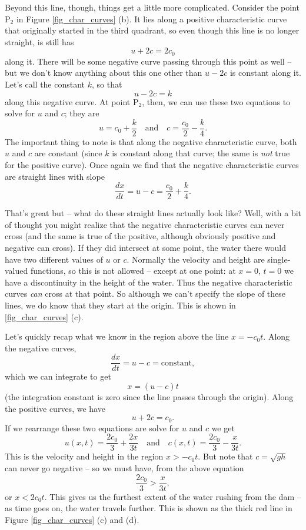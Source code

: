 Beyond this line, though, things get a little more complicated.  Consider the point P$_2$ in Figure \ref{fig_char_curves} (b).  It lies along a positive characteristic curve that originally started in the third quadrant, so even though this line is no longer straight, is still has
\[
u + 2c = 2c_0
\]
along it.  There will be some negative curve passing through this point as well -- but we don't know anything about this one other than $u-2c$ is constant along it.  Let's call the constant $k$, so that
\[
u - 2c = k
\]
along this negative curve.  At point P$_2$, then, we can use these two equations to solve for $u$ and $c$; they are
\[
u = c_0 + \frac{k}{2} \quad \text{and} \quad c = \frac{c_0}{2} - \frac{k}{4}.
\]
The important thing to note is that along the negative characteristic curve, both $u$ and $c$ are constant (since $k$ is constant along that curve; the same is \emph{not} true for the positive curve).  Once again we find that the negative characteristic curves are straight lines with slope
\[
\frac{dx}{dt} = u - c = \frac{c_0}{2} + \frac{k}{4}.
\]

That's great but -- what do these straight lines actually look like?  Well, with a bit of thought you might realize that the negative characteristic curves can never cross (and the same is true of the positive, although obviously positive and negative can cross).  If they did intersect at some point, the water there would have two different values of $u$ or $c$.  Normally the velocity and height are single-valued functions, so this is not allowed -- except at one point: at $x = 0$, $t=0$ we have a discontinuity in the height of the water.  Thus the negative characteristic curves \emph{can} cross at that point.  So although we can't specify the slope of these lines, we do know that they start at the origin.  This is shown in \ref{fig_char_curves} (c). 

Let's quickly recap what we know in the region above the line $x = -c_0 t$.  Along the negative curves, 
\[
\frac{dx}{dt} = u - c = \text{constant},
\]
which we can integrate to get
\[
x = (u-c) t
\]
(the integration constant is zero since the line passes through the origin).
Along the positive curves, we have 
\[
u + 2c = c_0.
\]
If we rearrange these two equations are solve for $u$ and $c$ we get
\begin{equation}
\label{eq_dam_dist}
u(x, t) = \frac{2c_0}{3} + \frac{2x}{3t} \quad \text{and} \quad c(x, t) = \frac{2c_0}{3} - \frac{x}{3t}.
\end{equation}
This is the velocity and height in the region $x>-c_0 t$.  But note that $c = \sqrt{gh}$ can never go negative -- so we must have, from the above equation
\[
\frac{2c_0}{3} > \frac{x}{3t},
\]
or $x < 2c_0 t$.  This gives us the furthest extent of the water rushing from the dam -- as time goes on, the water travels further.  This is shown as the thick red line in Figure \ref{fig_char_curves} (c) and (d).

